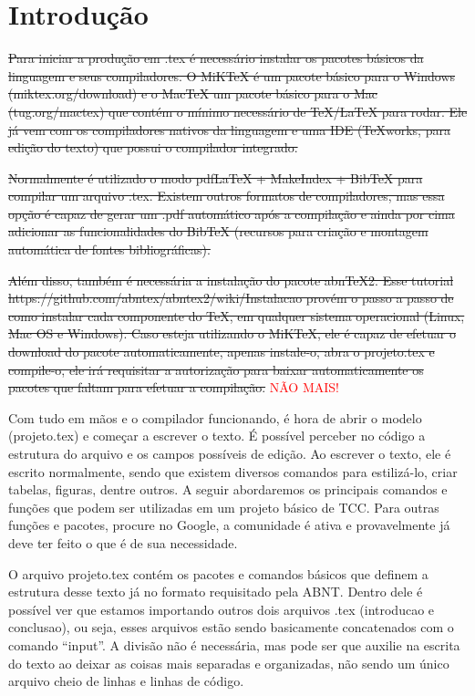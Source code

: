 \chapter{Introdução}
\label{c.introducao}

\sout{Para iniciar a produção em .tex é necessário instalar os pacotes básicos da linguagem e seus compiladores. O MiKTeX é um pacote básico para o Windows (miktex.org/download) e o MacTeX um pacote básico para o Mac (tug.org/mactex) que contém o mínimo necessário de TeX/LaTeX para rodar. Ele já vem com os compiladores nativos da linguagem e uma IDE (TeXworks, para edição do texto) que possui o compilador integrado.}

\sout{Normalmente é utilizado o modo pdfLaTeX + MakeIndex + BibTeX para compilar um arquivo .tex. Existem outros formatos de compiladores, mas essa opção é capaz de gerar um .pdf automático após a compilação e ainda por cima adicionar as funcionalidades do BibTeX (recursos para criação e montagem automática de fontes bibliográficas).}

\sout{Além disso, também é necessária a instalação do pacote abnTeX2. Esse tutorial https://github.com/abntex/abntex2/wiki/Instalacao provém o passo a passo de como instalar cada componente do TeX, em qualquer sistema operacional (Linux, Mac OS e Windows). Caso esteja utilizando o MiKTeX, ele é capaz de efetuar o download do pacote automaticamente, apenas instale-o, abra o projeto.tex e compile-o, ele irá requisitar a autorização para baixar automaticamente os pacotes que faltam para efetuar a compilação.} \textcolor{red}{NÃO MAIS!}

Com tudo em mãos e o compilador funcionando, é hora de abrir o modelo (projeto.tex) e começar a escrever o texto. É possível perceber no código a estrutura do arquivo e os campos possíveis de edição. Ao escrever o texto, ele é escrito normalmente, sendo que existem diversos comandos para estilizá-lo, criar tabelas, figuras, dentre outros. A seguir abordaremos os principais comandos e funções que podem ser utilizadas em um projeto básico de TCC. Para outras funções e pacotes, procure no Google, a comunidade é ativa e provavelmente já deve ter feito o que é de sua necessidade.

O arquivo projeto.tex contém os pacotes e comandos básicos que definem a estrutura desse texto já no formato requisitado pela ABNT. Dentro dele é possível ver que estamos importando outros dois arquivos .tex (introducao e conclusao), ou seja, esses arquivos estão sendo basicamente concatenados com o comando ``input''. A divisão não é necessária, mas pode ser que auxilie na escrita do texto  ao deixar as coisas mais separadas e organizadas, não sendo um único arquivo cheio de linhas e linhas de código. 

